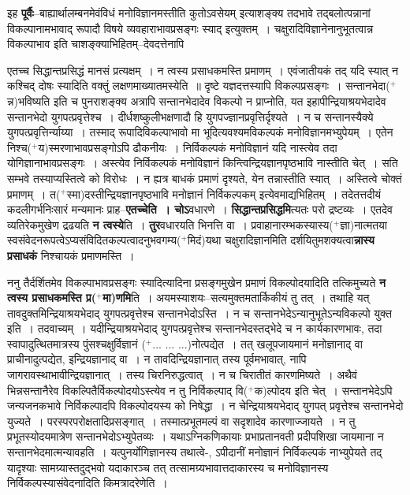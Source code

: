 \documentclass[article,12pt,a4paper]{memoir}
\newcommand{\add}[1]{($^{+}$#1)}
\begin{document}
	  \pstart इह \textbf{पूर्वैः}--बाह्यार्थालम्बनमेवंविधं मनोविज्ञानमस्तीति कुतोऽवसेयम् इत्याशङ्क्य तदभावे तद्बलोत्पन्नानां विकल्पानामभावाद् रूपादौ विषये व्यवहाराभावप्रसङ्गः स्याद्  इत्युक्तम् । चक्षुरादिविज्ञानेनानुभूतत्वान्न विकल्पाभाव इति चाशङ्क्याभिहितम्--देवदत्तेनापि  \leavevmode{} 
	  
	एतच्च सिद्धान्तप्रसिद्धं मानसं प्रत्यक्षम् । न त्वस्य प्रसाधकमस्ति प्रमाणम् । एवंजातीयकं तद् यदि स्यात् न कश्चिद् दोषः स्यादिति वक्तुं लक्षणमाख्यातमस्येति ॥ दृष्टे यज्ञदत्तस्यापि विकल्पप्रसङ्गः । सन्तानभेदा\add{न्न}भविष्यति इति च पुनराशङ्क्य अत्रापि सन्तानभेदादेव विकल्पो न प्राप्नोति, यत इहापीन्द्रियाश्रयभेदादेव सन्तानभेदो युगपत्प्रवृत्तेश्च । दीर्धशष्कुलीभक्षणादौ हि युगपज्ज्ञानप्रवृत्तिर्दृश्यते । न च सन्तानस्यैक्ये युगपत्प्रवृत्तिर्न्याय्या । तस्माद् रूपादिविकल्पाभावो मा भूदित्यवश्यमविकल्पकं मनोविज्ञानमभ्युपेयम् । एतेन निश्च\add{य}स्मरणाभावप्रसङ्गोऽपि ढौकनीयः । निर्विकल्पकं मनोविज्ञानं यदि नास्त्येव तदा योगिज्ञानाभावप्रसङ्गः । अस्त्येव निर्विकल्पकं मनोविज्ञानं किन्त्विन्द्रियज्ञानपृष्ठभावि नास्तीति चेत् । सति सम्भवे तस्याप्यस्तित्वे को विरोधः । न ह्यत्र बाधकं प्रमाणं दृश्यते, येन तन्नास्तीति स्यात् । अस्तित्वे चोक्तं प्रमाणम् । त\add{स्मा}दस्तीन्द्रियज्ञानपृष्ठभावि मनोज्ञानं निर्विकल्पकम्  इत्येवमाद्यभिहितम् । तदेतत्तदीयं कदलीगर्भनिःसारं मन्यमानः प्राह--\textbf{एतच्चेति । चोऽ}वधारणे । \textbf{सिद्धान्तप्रसिद्धमि}त्यतः परो द्रष्टव्यः । एतदेव व्यतिरेकमुखेण द्रढयति \textbf{न त्वस्ये}ति । \textbf{तुर}वधारयति भिनत्ति वा । प्रवाहानारम्भकस्यास्य\add{ज्ञा}नात्मतया स्वसंवेदनरूपत्वेऽप्यसंविदितकल्पत्वादनुभवगम्य\add{मिदं}यथा चक्षुरादिज्ञानमिति दर्शयितुमशक्यत्वा\textbf{न्नास्य प्रसाधकं} निश्चायकं प्रमाणमस्ति ।
	\pend
      

	  \pstart ननु तैर्दर्शितमेव विकल्पाभावप्रसङ्गः स्यादित्यादिना प्रसङ्गमुखेन प्रमाणं विकल्पोदयादिति तत्किमुच्यते \textbf{न त्वस्य प्रसाधकमस्ति प्र\add{मा}णमि}ति । अयमस्याशयः--सत्यमुक्तमतार्किकीयं तु तत् । तथाहि यत् तावदुक्तमिन्द्रियाश्रयभेदाद् युगपत्प्रवृत्तेश्च सन्तानभेदोऽस्ति । न च सन्तानभेदेऽन्यानुभूतेऽन्यविकल्पो युक्त इति । तदवाच्यम् । यदीन्द्रियाश्रयभेदाद् युगपत्प्रवृत्तेश्च सन्तानभेदस्तद्भेदे च न कार्यकारणभावः, तदा स्वापादुत्थितमात्रस्य पुंसश्चक्षुर्विज्ञानं \add{... ... ...}नोत्पद्येत । तत् खलूपजायमानं मनोज्ञानाद् वा प्राचीनादुत्पद्येत, इन्द्रियज्ञानाद् वा । न तावदिन्द्रियज्ञानात् तस्य पूर्वमभावात्, नापि जागरावस्थाभावीन्द्रियज्ञानात् । तस्य चिरनिरुद्धत्वात् । न च चिरातीतं कारणमिष्यते । अथैवं भिन्नसन्तानैरेव विकल्पितैर्विकल्पोदयोऽस्त्येव न तु निर्विकल्पाद् वि\add{क}ल्पोदय इति चेत् । सन्तानभेदेऽपि जन्यजनकभावे निर्विकल्पादपि विकल्पोदयस्य को निषेद्धा । न चेन्द्रियाश्रयभेदाद् युगपत् प्रवृत्तेश्च सन्तानभेदो युज्यते । परस्परपरोक्षतादिप्रसङ्गात् । तस्मात्प्रभूतमल्पं वा सदृशादेव कारणाज्जायते । न तु प्रभूतस्योदयमात्रेण सन्तानभेदोऽभ्युपेतव्यः । यथाऽग्निकणिकायाः \leavevmode{}प्रभाप्रतानवती प्रदीपशिखा जायमाना न सन्तानभेदमात्मन्यावहति । यत्पुनर्योगिज्ञानस्य तथात्वे-, ऽपीदानीं मनोज्ञानं निर्विकल्पकं नाभ्युपेयते तद् यादृश्याः सामग्र्यास्तदुद्भवो यदाकारञ्च तत् तत्सामग्र्यभावात्तदाकारस्य च मनोविज्ञानस्य निर्विकल्पस्यासंवेदनादिति किमत्रादरेणेति ।
	\pend
      
\end{document}
